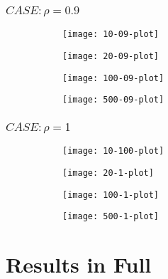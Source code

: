 \pagebreak

\subsubsection{$CASE: \rho = 0.9$}

\begin{figure}[htp]
	
	\begin{subfigure}{0.23\textwidth}
		\centering
		\texttt{[image: 10-09-plot]}
	\end{subfigure}
	\begin{subfigure}{0.23\textwidth}
		\centering
		\texttt{[image: 20-09-plot]}
	\end{subfigure}
	\begin{subfigure}{0.23\textwidth}
		\centering
		\texttt{[image: 100-09-plot]}
	\end{subfigure}
	\begin{subfigure}{0.23\textwidth}
		\centering
		\texttt{[image: 500-09-plot]}
	\end{subfigure}
\end{figure}

\subsubsection{$CASE: \rho = 1$}

\begin{figure}[htp]
	\centering
	\begin{subfigure}{0.23\textwidth}
		\centering
		\texttt{[image: 10-100-plot]}
	\end{subfigure}
	\begin{subfigure}{0.23\textwidth}
		\centering
		\texttt{[image: 20-1-plot]}
	\end{subfigure}
	\begin{subfigure}{0.23\textwidth}
		\centering
		\texttt{[image: 100-1-plot]}
	\end{subfigure}
	\begin{subfigure}{0.23\textwidth}
		\centering
		\texttt{[image: 500-1-plot]}
	\end{subfigure}
\end{figure} 

\section{Results in Full}

